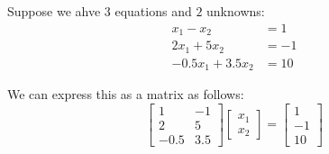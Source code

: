 \documentclass[openany]{book}
\begin{document}
\begin{example}
	Suppose we ahve $3$ equations and $2$ unknowns:
	\begin{align*}
		x_1 - x_2 &= 1 \\
		2x_1 + 5x_2 &= -1 \\
		-0.5x_1 + 3.5x_2 &= 10
	\end{align*}

	We can express this as a matrix as follows:
	\begin{equation*}
		\begin{bmatrix}
			1 & -1 \\
			2 & 5 \\
			-0.5 & 3.5
		\end{bmatrix}
		\begin{bmatrix}
			x_1 \\ x_2
		\end{bmatrix} =
		\begin{bmatrix}
			1 \\ -1 \\ 10
		\end{bmatrix}
	\end{equation*}
\end{example}
\end{document}
